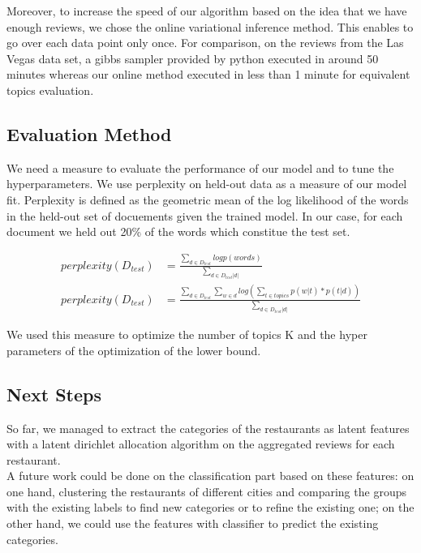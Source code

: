 \documentclass[paper=a4, fontsize=11pt]{scrartcl} %
\numberwithin{equation}{section}
\numberwithin{figure}{section}
\numberwithin{table}{section}
\begin{document}
Moreover, to increase the speed of our algorithm based on the idea that we have enough reviews, we chose the online variational inference method. This enables to go over each data point only once. For comparison, on the reviews from the Las Vegas data set, a gibbs sampler provided by python executed in around 50 minutes whereas our online method executed in less than 1 minute for equivalent topics evaluation.

\subsection*{Evaluation Method}

We need a measure to evaluate the performance of our model and to tune the hyperparameters. We use perplexity on held-out data as a measure of our model fit. Perplexity is defined as the geometric mean of the log likelihood of the words in the held-out set of docuements given the trained model. In our case, for each document we held out 20\% of the words which constitue the test set.

\begin{align*}
	perplexity(D_{test}) & = \frac{\sum_{d \in D_{test}} log p(words)}{\sum_{d \in D_{test}|d|}}\\
	perplexity(D_{test}) & = \frac{\sum_{d \in D_{test}} \sum_{w \in d} log \left( \sum_{t \in topics} p(w|t) * p(t|d) \right)}{\sum_{d \in D_{test}|d|}}
\end{align*}

We used this measure to optimize the number of topics K and the hyper parameters of the optimization of the lower bound.

\subsection*{Next Steps}

So far, we managed to extract the categories of the restaurants as latent features with a latent dirichlet allocation algorithm on the aggregated reviews for each restaurant. \\

A future work could be done on the classification part based on these features: on one hand, clustering the restaurants of different cities and comparing the groups with the existing labels to find new categories or to refine the existing one; on the other hand, we could use the features with classifier to predict the existing categories. \\
\end{document}
